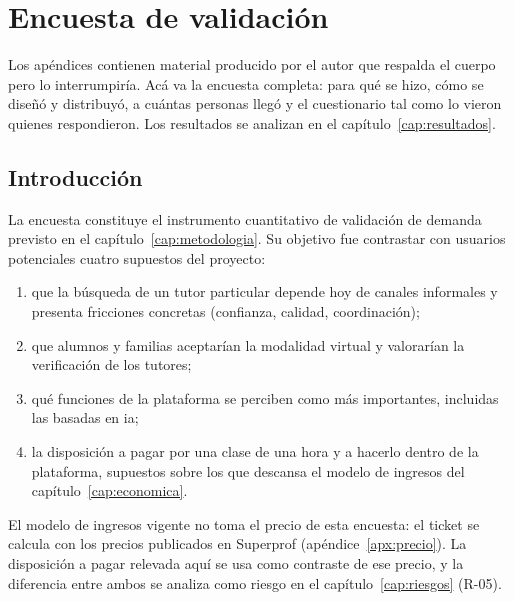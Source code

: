 
\chapter{Encuesta de validación}\label{apx:encuesta}

\begin{guia}
Los apéndices contienen material producido por el autor que respalda
el cuerpo pero lo interrumpiría. Acá va la encuesta completa: para qué
se hizo, cómo se diseñó y distribuyó, a cuántas personas llegó y el
cuestionario tal como lo vieron quienes respondieron. Los resultados
se analizan en el capítulo~\ref{cap:resultados}.
\end{guia}

\section{Introducción}

La encuesta constituye el instrumento cuantitativo de validación de
demanda previsto en el capítulo~\ref{cap:metodologia}. Su objetivo fue
contrastar con usuarios potenciales cuatro supuestos del proyecto:

\begin{enumerate}
    \item que la búsqueda de un tutor particular depende hoy de canales
          informales y presenta fricciones concretas (confianza, calidad,
          coordinación);
    \item que alumnos y familias aceptarían la modalidad virtual y
          valorarían la verificación de los tutores;
    \item qué funciones de la plataforma se perciben como más
          importantes, incluidas las basadas en \gls{ia};
    \item la disposición a pagar por una clase de una hora y a hacerlo
          dentro de la plataforma, supuestos sobre los que descansa el
          modelo de ingresos del capítulo~\ref{cap:economica}.
\end{enumerate}

El modelo de ingresos vigente no toma el precio de esta encuesta: el
ticket se calcula con los precios publicados en Superprof
(apéndice~\ref{apx:precio}). La disposición a pagar relevada aquí se usa
como contraste de ese precio, y la diferencia entre ambos se analiza como
riesgo en el capítulo~\ref{cap:riesgos} (R-05).

